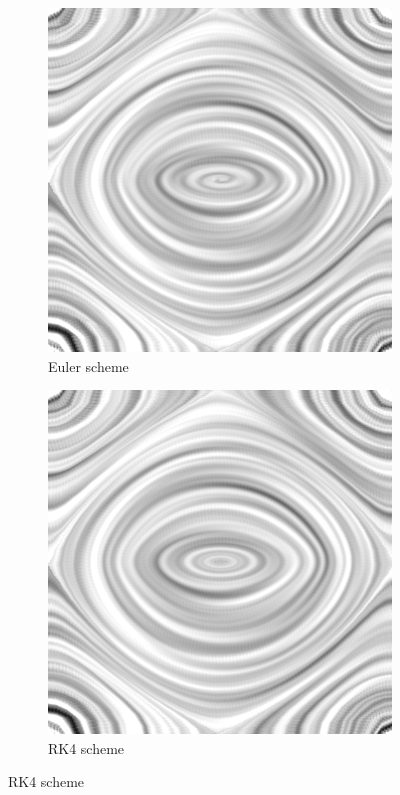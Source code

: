 \documentclass{article}
\begin{document}
\begin{figure}[h!]
    \centering
    \begin{subfigure}{0.48\textwidth}
        \centering
        \includegraphics[width=\textwidth]{lic_metsim_euler.png}
        \caption{Euler scheme}
    \end{subfigure}
    \hfill
    \begin{subfigure}{0.48\textwidth}
        \centering
        \includegraphics[width=\textwidth]{lic_metsim_rk4.png}
        \caption{RK4 scheme}
    \end{subfigure}
\end{figure}
\end{document}

